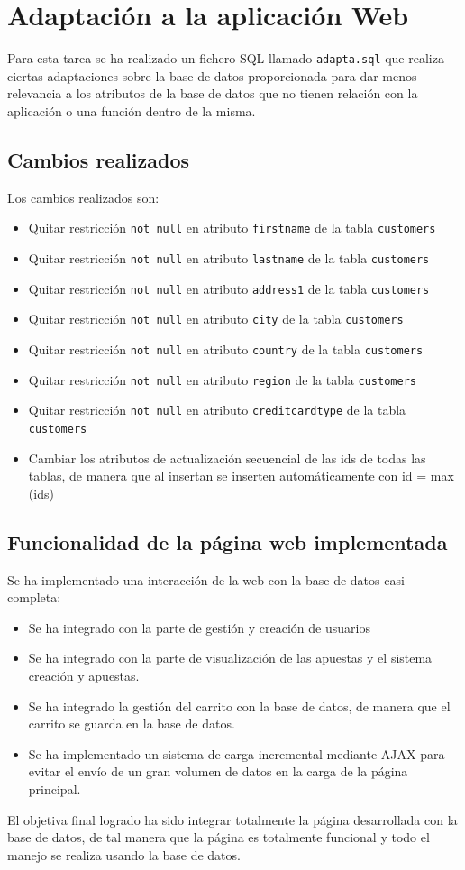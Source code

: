 \documentclass{article}
\begin{document}
\section{Adaptación a la aplicación Web}
Para esta tarea se ha realizado un fichero SQL llamado \texttt{adapta.sql} que realiza ciertas adaptaciones sobre la base de datos proporcionada para dar menos relevancia a los atributos de la base de datos que no tienen relación con la aplicación o una función dentro de la misma.

\subsection{Cambios realizados}
Los cambios realizados son:

\begin{itemize}
\item Quitar restricción \texttt{not null} en atributo \texttt{firstname} de la tabla \texttt{customers} 
\item Quitar restricción \texttt{not null} en atributo \texttt{lastname} de la tabla \texttt{customers} 
\item Quitar restricción \texttt{not null} en atributo \texttt{address1} de la tabla \texttt{customers} 
\item Quitar restricción \texttt{not null} en atributo \texttt{city} de la tabla \texttt{customers} 
\item Quitar restricción \texttt{not null} en atributo \texttt{country} de la tabla \texttt{customers} 
\item Quitar restricción \texttt{not null} en atributo \texttt{region} de la tabla \texttt{customers} 
\item Quitar restricción \texttt{not null} en atributo \texttt{creditcardtype} de la tabla \texttt{customers} 
\item Cambiar los atributos de actualización secuencial de las ids de todas las tablas, de manera que al insertan se inserten automáticamente con id = max (ids)
\end{itemize}

\subsection{Funcionalidad de la página web implementada}

Se ha implementado una interacción de la web con la base de datos casi completa:
\begin{itemize}
\item Se ha integrado con la parte de gestión y creación de usuarios
\item Se ha integrado con la parte de visualización de las apuestas y el sistema creación y apuestas.
\item Se ha integrado la gestión del carrito con la base de datos, de manera que el carrito se guarda en la base de datos.
\item Se ha implementado un sistema de carga incremental mediante AJAX para evitar el envío de un gran volumen de datos en la carga de la página principal.
\end{itemize}

El objetiva final logrado ha sido integrar totalmente la página desarrollada con la base de datos, de tal manera que la página es totalmente funcional y todo el manejo se realiza usando la base de datos.
\end{document}
